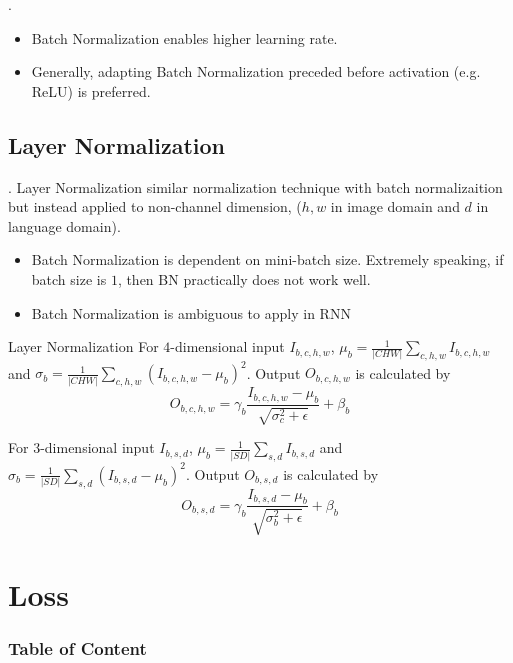 \documentclass[8pt]{beamer}
\newcommand{\abs}[1]{\left\lvert #1 \right\rvert}
\begin{document}
\begin{frame}{.}
    \begin{itemize}
        \item Batch Normalization enables higher learning rate.
        \item Generally, adapting Batch Normalization preceded before activation (e.g. ReLU) is preferred.
    \end{itemize}
\end{frame}

\subsection{Layer Normalization}

\begin{frame}{.}
    Layer Normalization similar normalization technique with batch normalizaition but instead applied to non-channel dimension, ($h,w$ in image domain and $d$ in language domain).
    \begin{itemize}
        \item Batch Normalization is dependent on mini-batch size. Extremely speaking, if batch size is $1$, then BN practically does not work well.
        \item Batch Normalization is ambiguous to apply in RNN
    \end{itemize}

    \begin{block}{Layer Normalization}
        For $4$-dimensional input $I_{b,c,h,w}$, $\mu_b = \frac{1}{\abs{C H W}}\sum_{c,h,w} I_{b,c,h,w}$ and $\sigma_b = \frac{1}{\abs{C H W}} \sum_{c,h,w} (I_{b,c,h,w} - \mu_b)^2$. Output $O_{b,c,h,w}$ is calculated by
        \[
            O_{b,c,h,w} = \gamma_b \frac{I_{b,c,h,w} - \mu_b}{\sqrt{\sigma_c^2 + \epsilon}} + \beta_b
        \]

        For $3$-dimensional input $I_{b,s,d}$, $\mu_b = \frac{1}{\abs{S D}}\sum_{s,d} I_{b,s,d}$ and $\sigma_b = \frac{1}{\abs{S D}} \sum_{s,d} (I_{b,s,d} - \mu_b)^2$. Output $O_{b,s,d}$ is calculated by
        \[
            O_{b,s,d} = \gamma_b \frac{I_{b,s,d} - \mu_b}{\sqrt{\sigma_b^2 + \epsilon}} + \beta_b
        \]
    \end{block}
\end{frame}


\section{Loss}

\begingroup
    \begin{frame}
        \frametitle{Table of Content}
        \tableofcontents
    \end{frame}
\endgroup
\end{document}
